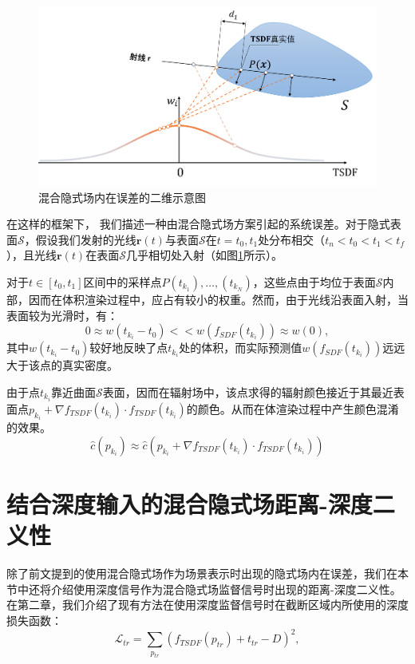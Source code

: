 \begin{figure}[t]
    \centering
    \includegraphics[width=\textwidth]{undergraduate-thesis/images/omninerf-error2.pdf}
    \caption{混合隐式场内在误差的二维示意图}
    \label{fig:omninerf-internal error}
\end{figure}

在这样的框架下， 我们描述一种由混合隐式场方案引起的系统误差。对于隐式表面$\mathcal{S}$，假设我们发射的光线$\mathbf{r}(t)$与表面$\mathcal{S}$在$t=t_0,t_1$处分布相交（$t_n<t_0<t_1<t_f$），且光线$\mathbf{r}(t)$在表面$\mathcal{S}$几乎相切处入射（如图\ref{fig:omninerf-internal error}所示）。

对于$t\in[t_0, t_1]$区间中的采样点$P(t_{k_1}), \dots, (t_{k_N})$，这些点由于均位于表面$\mathcal{S}$内部，因而在体积渲染过程中，应占有较小的权重。然而，由于光线沿表面入射，当表面较为光滑时，有：
\begin{equation}
    0\approx w(t_{k_i} - t_0) << w(f_{SDF}(t_{k_i})) \approx w(0),
\end{equation}
其中$w(t_{k_i} - t_0)$较好地反映了点$t_{k_i}$处的体积，而实际预测值$w(f_{SDF}(t_{k_i}))$远远大于该点的真实密度。

由于点$t_{k_i}$靠近曲面$\mathcal{S}$表面，因而在辐射场中，该点求得的辐射颜色接近于其最近表面点$p_{k_i} + \nabla f_{TSDF}(t_{k_i})\cdot f_{TSDF}(t_{k_i})$的颜色。从而在体渲染过程中产生颜色混淆的效果。
\begin{equation}
    \hat{c}(p_{k_i})\approx\hat{c}\left(p_{k_i} + \nabla f_{TSDF}(t_{k_i})\cdot f_{TSDF}(t_{k_i})\right)
\end{equation}


\section{结合深度输入的混合隐式场距离-深度二义性}
除了前文提到的使用混合隐式场作为场景表示时出现的隐式场内在误差，我们在本节中还将介绍使用深度信号作为混合隐式场监督信号时出现的距离-深度二义性。在第二章，我们介绍了现有方法\cite{azinovic_neural_2022}在使用深度监督信号时在截断区域内所使用的深度损失函数：
\begin{equation}
    \mathcal{L}_{tr} = \sum_{p_{tr}}(f_{TSDF}(p_{tr})+t_{tr}-D)^2,
\end{equation}

